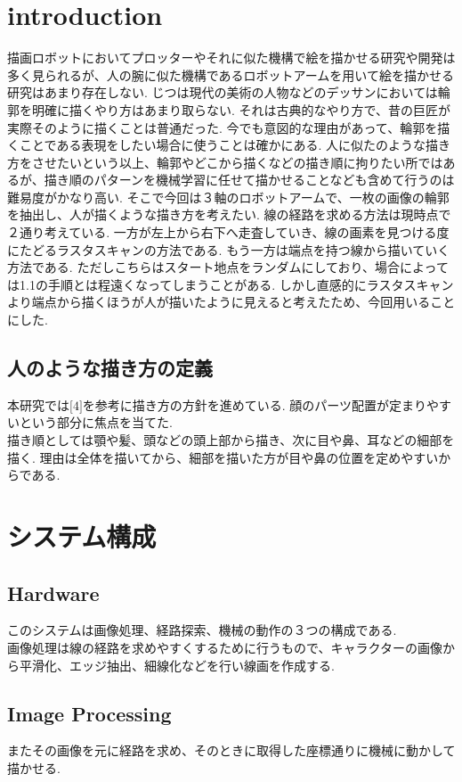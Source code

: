 \documentclass[a4j]{jarticle}			%
\begin{document}
\begin{multicols}{2} %

\section{introduction}
描画ロボットにおいてプロッターやそれに似た機構で絵を描かせる研究や開発は多く見られるが、人の腕に似た機構であるロボットアームを用いて絵を描かせる研究はあまり存在しない.
じつは現代の美術の人物などのデッサンにおいては輪郭を明確に描くやり方はあまり取らない.
それは古典的なやり方で、昔の巨匠が実際そのように描くことは普通だった.
今でも意図的な理由があって、輪郭を描くことである表現をしたい場合に使うことは確かにある.
人に似たのような描き方をさせたいという以上、輪郭やどこから描くなどの描き順に拘りたい所ではあるが、描き順のパターンを機械学習に任せて描かせることなども含めて行うのは難易度がかなり高い.
そこで今回は３軸のロボットアームで、一枚の画像の輪郭を抽出し、人が描くような描き方を考えたい.
線の経路を求める方法は現時点で２通り考えている. 
一方が左上から右下へ走査していき、線の画素を見つける度にたどるラスタスキャンの方法である. 
もう一方は端点を持つ線から描いていく方法である.
ただしこちらはスタート地点をランダムにしており、場合によっては1.1の手順とは程遠くなってしまうことがある. 
しかし直感的にラスタスキャンより端点から描くほうが人が描いたように見えると考えたため、今回用いることにした.

\subsection{人のような描き方の定義}
本研究では$\lbrack4\rbrack$を参考に描き方の方針を進めている.
顔のパーツ配置が定まりやすいという部分に焦点を当てた.\\
描き順としては顎や髪、頭などの頭上部から描き、次に目や鼻、耳などの細部を描く.
理由は全体を描いてから、細部を描いた方が目や鼻の位置を定めやすいからである.

\section{システム構成}
\subsection{Hardware}
このシステムは画像処理、経路探索、機械の動作の３つの構成である.\\
画像処理は線の経路を求めやすくするために行うもので、キャラクターの画像から平滑化、エッジ抽出、細線化などを行い線画を作成する. 
\subsection{Image Processing}
またその画像を元に経路を求め、そのときに取得した座標通りに機械に動かして描かせる.\\ 


\end{multicols}
\end{document}
